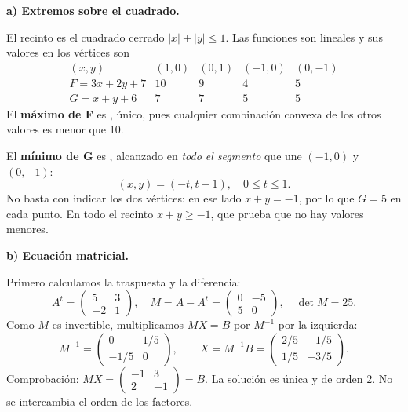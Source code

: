 \textbf{a) Extremos sobre el cuadrado.}\par\nopagebreak[4]
El recinto es el cuadrado cerrado $|x|+|y|\leq1$. Las funciones son lineales y sus valores en los vértices son
\[
\begin{array}{c|rrrr}
(x,y)&(1,0)&(0,1)&(-1,0)&(0,-1)\\\hline
F=3x+2y+7&10&9&4&5\\
G=x+y+6&7&7&5&5
\end{array}
\]
El \textbf{máximo de F} es , único, pues cualquier combinación convexa de los otros valores es menor que 10.

El \textbf{mínimo de G} es , alcanzado en \emph{todo el segmento} que une $(-1,0)$ y $(0,-1)$:
\[
\boxed{(x,y)=(-t,t-1),\quad0\leq t\leq1.}
\]
No basta con indicar los dos vértices: en ese lado $x+y=-1$, por lo que $G=5$ en cada punto. En todo el recinto $x+y\geq-1$, que prueba que no hay valores menores.

\textbf{b) Ecuación matricial.}\par\nopagebreak[4]
Primero calculamos la traspuesta y la diferencia:
\[
A^t=\begin{pmatrix}5&3\\-2&1\end{pmatrix},\quad
M=A-A^t=\begin{pmatrix}0&-5\\5&0\end{pmatrix},\quad\det M=25.
\]
Como $M$ es invertible, multiplicamos $MX=B$ por $M^{-1}$ por la izquierda:
\[
M^{-1}=\begin{pmatrix}0&1/5\\-1/5&0\end{pmatrix},\qquad
\boxed{X=M^{-1}B=\begin{pmatrix}2/5&-1/5\\1/5&-3/5\end{pmatrix}.}
\]
Comprobación: $MX=\begin{pmatrix}-1&3\\2&-1\end{pmatrix}=B$. La solución es única y de orden 2. No se intercambia el orden de los factores.
